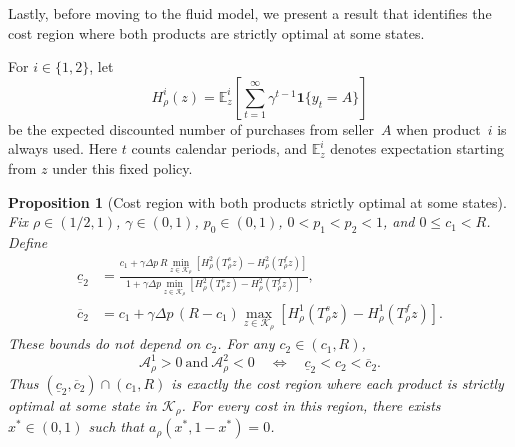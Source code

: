 \documentclass[11pt]{article}
\newcommand{\E}{\mathbb E}
\newcommand{\Ind}[1]{\mathbf 1\{#1\}}
\newtheorem{proposition}{Proposition}
\begin{document}
Lastly, before moving to the fluid model, we present a result that identifies the cost region where both products are strictly optimal at some states.

For $i\in\{1,2\}$, let
\begin{equation}
H_\rho^i(z)
=\E_z^i\left[\sum_{t=1}^{\infty}\gamma^{t-1}\Ind{y_t=A}\right]
\end{equation}
be the expected discounted number of purchases from seller~$A$ when
product~$i$ is always used. Here $t$ counts calendar periods, and
$\E_z^i$ denotes expectation starting from $z$ under this fixed policy.

\begin{proposition}[Cost region with both products strictly optimal at some states]
\label{prop:cost-region}
Fix $\rho\in(1/2,1)$, $\gamma\in(0,1)$, $p_0\in(0,1)$,
$0<p_1<p_2<1$, and $0\leq c_1<R$. Define
\begin{align*}
\underline c_2
&=\frac{
 c_1+\gamma\Delta p\,R
 \displaystyle\min_{z\in\mathcal K_\rho}
 \left[H_\rho^2(T_\rho^s z)-H_\rho^2(T_\rho^f z)\right]
}{
 1+\gamma\Delta p
 \displaystyle\min_{z\in\mathcal K_\rho}
 \left[H_\rho^2(T_\rho^s z)-H_\rho^2(T_\rho^f z)\right]
},\\[1ex]
\overline c_2
&=c_1+\gamma\Delta p\,(R-c_1)
\max_{z\in\mathcal K_\rho}
\left[H_\rho^1(T_\rho^s z)-H_\rho^1(T_\rho^f z)\right].
\end{align*}
These bounds do not depend on $c_2$. For any $c_2\in(c_1,R)$,
\begin{equation}
\mathcal A_\rho^1>0\ \text{and}\ \mathcal A_\rho^2<0
\quad\Longleftrightarrow\quad
\underline c_2<c_2<\overline c_2.
\end{equation}
Thus $(\underline c_2,\overline c_2)\cap(c_1,R)$ is exactly the cost
region where each product is strictly optimal at some state in
$\mathcal K_\rho$. For every cost in this region, there exists
$x^*\in(0,1)$ such that $a_\rho(x^*,1-x^*)=0$.
\end{proposition}
\end{document}
